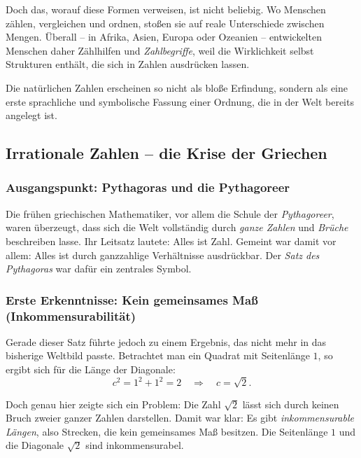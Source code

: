 Doch das, worauf diese Formen verweisen, ist nicht beliebig.
Wo Menschen zählen, vergleichen und ordnen,
stoßen sie auf reale Unterschiede zwischen Mengen.
Überall -- in Afrika, Asien, Europa oder Ozeanien --
entwickelten Menschen daher Zählhilfen und
\emph{Zahlbegriffe},
weil die Wirklichkeit selbst Strukturen enthält,
die sich in Zahlen ausdrücken lassen.

Die natürlichen Zahlen erscheinen so nicht als bloße Erfindung,
sondern als eine erste sprachliche und symbolische Fassung
einer Ordnung, die in der Welt bereits angelegt ist.


\newpage
\noindent
\subsection{Irrationale Zahlen -- die Krise der Griechen}
\label{sec:2.2_irrat}

\subsubsection*{Ausgangspunkt: Pythagoras und die Pythagoreer}
Die frühen griechischen Mathematiker,
vor allem die Schule der \emph{Pythagoreer},
waren überzeugt, dass sich die Welt vollständig
durch \emph{ganze Zahlen} und \emph{Brüche}
beschreiben lasse.
Ihr Leitsatz lautete: \glqq Alles ist Zahl\grqq.
Gemeint war damit vor allem:
Alles ist durch ganzzahlige Verhältnisse ausdrückbar.
Der \emph{Satz des Pythagoras}
war dafür ein zentrales Symbol.

\subsubsection*{Erste Erkenntnisse: Kein gemeinsames Maß (Inkommensurabilität)}
Gerade dieser Satz führte jedoch zu einem Ergebnis,
das nicht mehr in das bisherige Weltbild passte.
Betrachtet man ein Quadrat mit Seitenlänge $1$,
so ergibt sich für die Länge der Diagonale:
\[
c^2 = 1^2 + 1^2 = 2
\quad \Rightarrow \quad
c = \sqrt{2}.
\]

Doch genau hier zeigte sich ein Problem:
Die Zahl $\sqrt{2}$ lässt sich durch keinen Bruch zweier ganzer Zahlen darstellen.
Damit war klar:
Es gibt \emph{inkommensurable Längen},
also Strecken, die kein gemeinsames Maß besitzen.
Die Seitenlänge $1$ und die Diagonale $\sqrt{2}$ sind inkommensurabel.

